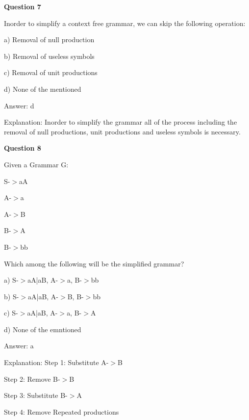 \documentclass{article}
\begin{document}
\begin{mdframed}[linewidth=1pt, roundcorner=5pt, linecolor=gray!30, backgroundcolor=gray!5]
\textbf{Question 7} 

Inorder to simplify a context free grammar, we can skip the following operation:

a) Removal of null production

b) Removal of useless symbols

c) Removal of unit productions

d) None of the mentioned
\vspace{5pt} \par
\begin{tcolorbox}[colback=green!5, colframe=green!40!black, title=Solution]
Answer: d

Explanation: Inorder to simplify the grammar all of the process including the removal of null productions, unit productions and useless symbols is necessary.
\end{tcolorbox}
\end{mdframed}
\newpage

\begin{mdframed}[linewidth=1pt, roundcorner=5pt, linecolor=gray!30, backgroundcolor=gray!5]
\textbf{Question 8} 

Given a Grammar G:

S-$>$aA

A-$>$a

A-$>$B

B-$>$A

B-$>$bb

Which among the following will be the simplified grammar?

a) S-$>$aA|aB, A-$>$a, B-$>$bb

b) S-$>$aA|aB, A-$>$B, B-$>$bb

c) S-$>$aA|aB, A-$>$a, B-$>$A

d) None of the emntioned
\vspace{5pt} \par
\begin{tcolorbox}[colback=green!5, colframe=green!40!black, title=Solution]
Answer: a

Explanation: Step 1: Substitute A-$>$B

                     Step 2: Remove B-$>$B

                     Step 3: Substitute B-$>$A

                     Step 4: Remove Repeated productions
\end{tcolorbox}
\end{mdframed}
\end{document}
